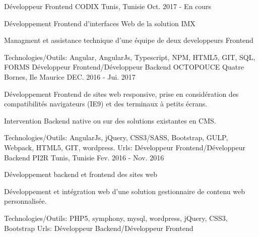 \begin{cventries}
  \techentries
    {Développeur Frontend}
    {CODIX}
    {Tunis, Tunisie}
    {Oct. 2017 - En cours}
    {
      \begin{cvitems}
		\item {Développement Frontend d'interfaces Web de la solution IMX }		
		\item {Managment et assistance technique d'une équipe de deux developpeurs Frontend}		
      \end{cvitems}
    }
    {\textcolor{awesome}{Technologies/Outils: } {\color{graytext}}  {Angular, AngularJs, Typescript, NPM, HTML5, GIT, SQL, FORMS}}
	{} 
    { 
    }
  \techentries
    {Développeur Frontend/Développeur Backend}
    {OCTOPOUCE}
    {Quatre Bornes, Ile Maurice}
    {DEC. 2016 - Jui. 2017}
    {
      \begin{cvitems}
		\item {Développement Frontend de sites web responsive, prise en considération des compatibilités navigateurs (IE9) et des terminaux à petits écrans.}		
		\item {Intervention Backend native ou sur des solutions existantes en CMS.}
      \end{cvitems}
    }
    {\textcolor{awesome}{Technologies/Outils: } {\color{graytext}}  {AngularJs, jQuery, CSS3/SASS, Bootstrap, GULP, Webpack, HTML5, GIT, wordpress.}}
    {Urls:} 
    { \href{http://anahita.mu/}{ \break
    }}
  \techentries
    {Développeur Frontend/Développeur Backend}
    {PI2R}
    {Tunis, Tunisie}
    {Fev. 2016 - Nov. 2016}
    {
      \begin{cvitems}
        \item {Développement backend et frontend des sites web }
        \item {Développement et intégration web d'une solution gestionnaire de contenu web personnalisée. }
      \end{cvitems}
    }
    {\textcolor{awesome}{Technologies/Outils: } {\color{graytext}}  {PHP5, symphony, mysql, wordpress, jQuery, CSS3, Bootstrap}}
    {Urls:} 
    {
    \href{http://www.milddream.com/fr/ }{} \break
    \href{http://www.ozeol.com/fr/}{} \break
    }    
  \techentries
    {Développeur Backend/Développeur Frontend}

\end{cventries}
